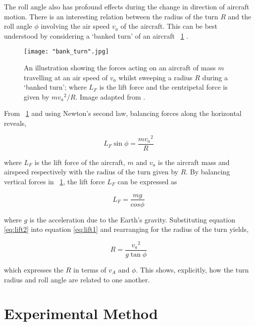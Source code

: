 \documentclass[11pt]{article}
\newcommand{\figref}[2][\figurename~]{#1\ref{#2}}
\begin{document}
The roll angle also has profound effects during the change in direction of aircraft motion. There is an interesting relation between the radius of the turn $R$ and the roll angle $\phi$ involving the air speed $v_a$ of the aircraft. This can be best understood by considering a `banked turn' of an aircraft \figref{fig:bank_turn} \cite{Web05}.

\begin{figure}[h]
\centering
\texttt{[image: "bank\_turn".jpg]}
\caption{An illustration showing the forces acting on an aircraft of mass $m$ travelling at an air speed of $v_a$ whilst sweeping a radius $R$ during a `banked turn'; where $L_F$ is the lift force and the centripetal force is given by $m{v_a}^2/R$. Image adapted from \cite{Web02}.}
\label{fig:bank_turn}
\end{figure}

From \figref{fig:bank_turn} and using Newton's second law, balancing forces along the horizontal reveals,

\begin{equation}
\label{eq:lift1}
L_F \sin{\phi} = \frac{m{v_a}^2}{R}
\end{equation}

where $L_F$ is the lift force of the aircraft, $m$ and $v_a$ is the aircraft mass and airspeed respectively with the radius of the turn given by $R$. By balancing vertical forces in \figref{fig:bank_turn}, the lift force $L_F$ can be expressed as 

\begin{equation}
\label{eq:lift2}
L_F = \frac{mg}{cos{\phi}}
\end{equation}

where $g$ is the acceleration due to the Earth's gravity. Substituting equation \eqref{eq:lift2} into equation \eqref{eq:lift1} and rearranging for the radius of the turn yields,

\begin{equation}
\label{eq:turn_radius}
R = \frac{{v_a}^2}{g \tan{\phi}}
\end{equation}

which expresses the $R$ in terms of $v_A$ and $\phi$. This shows, explicitly, how the turn radius and roll angle are related to one another.


\section{Experimental Method}
\label{sec:method}
\end{document}
